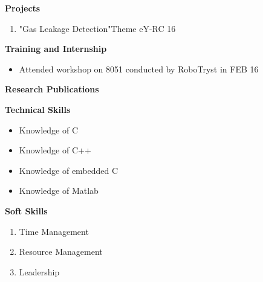 \documentclass{article}
\begin{document}
\begin{flushleft}
\textbf{Projects }
\begin{flushright}
\begin{enumerate}
\item "Gas Leakage Detection"Theme eY-RC 16
\end{enumerate} 
\end{flushright}
\end{flushleft}



\begin{flushleft}
\textbf{Training and Internship}
\begin{flushright}
\begin{itemize}
\item Attended workshop on 8051 conducted by RoboTryst in FEB 16
\end{itemize} 
\end{flushright}
\end{flushleft}


\begin{flushleft}
\textbf{Research Publications }
\end{flushleft}



\begin{flushleft}
\textbf{Technical Skills}
\begin{flushright}
\begin{itemize}
\item Knowledge of C
\item Knowledge of C++
\item Knowledge of embedded C
\item Knowledge of Matlab
\end{itemize} 
\end{flushright}
\end{flushleft}




\begin{flushleft}
\textbf{Soft Skills }
\begin{flushright}
\begin{enumerate}
\item Time Management
\item Resource Management
\item Leadership
\end{enumerate} 
\end{flushright}
\end{flushleft}
\end{document}
